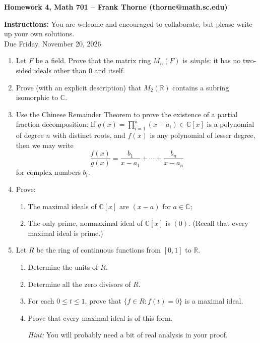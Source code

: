 \documentclass[12pt]{article}
\newcommand{\C}{\mathbb{C}}
\newcommand{\R}{\mathbb{R}}
\begin{document}
\setlength{\topmargin}{-2mm}





\begin{center}{\bf Homework 4, Math 701 -- Frank Thorne (thorne@math.sc.edu)}
\end{center}
\begin{center}
{\bf Instructions:} You are welcome and encouraged to collaborate, but please write up your own solutions. \\

Due  Friday, November 20, 2026.
\end{center}

\begin{enumerate}

\item
Let $F$ be a field. Prove that the matrix ring $M_n(F)$ is {\itshape simple}: it has no two-sided ideals other than $0$ and itself.

\item
Prove (with an explicit description) that $M_2(\R)$ contains a subring isomorphic to $\C$.

\item
Use the Chinese Remainder Theorem to prove the existence of a partial fraction decomposition: If 
$g(x) = \prod_{i=1}^n (x - a_i) \in \C[x]$ is a polynomial of degree $n$ with distinct roots, and $f(x)$ is any polynomial of lesser degree,
then we may write
\[
\frac{f(x)}{g(x)} = \frac{ b_1 }{x - a_1} + \cdots + \frac{b_n}{x - a_n}
\]
for complex numbers $b_i$.

\item
Prove:
\begin{enumerate}
\item
The maximal ideals of $\C[x]$ are $(x - a)$ for $a \in \C$; 
\item
The only prime, nonmaximal ideal of $\C[x]$ is $(0)$. (Recall that every maximal ideal is prime.)
\end{enumerate}

\item 
Let $R$ be the ring of continuous functions from $[0, 1]$ to $\mathbb{R}$. 
\begin{enumerate}
\item
Determine the units of $R$. 
\item 
Determine all the zero divisors of $R$.
\item 
For each $0 \leq t \leq 1$, prove that $\{ f \in R: f(t) = 0 \}$ is a maximal ideal.
\item 
Prove that every maximal ideal is of this form. 

{\itshape Hint:} You will probably need a bit of real analysis in your proof. 
\end{enumerate}

\end{enumerate}
\end{document}

